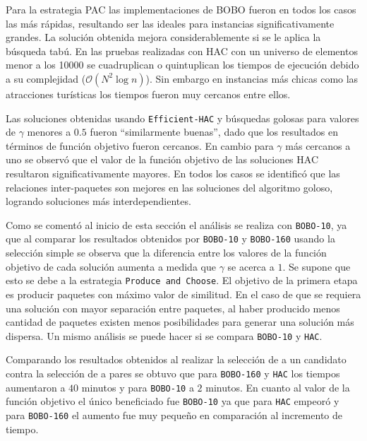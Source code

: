 Para la estrategia PAC las implementaciones de BOBO fueron en todos los casos las más rápidas, resultando ser las ideales para instancias significativamente grandes. La solución obtenida mejora considerablemente si se le aplica la búsqueda tabú. En las pruebas realizadas con HAC con un universo de elementos menor a los 10000 se cuadruplican o quintuplican los tiempos de ejecución debido a su complejidad ($\mathcal{O}(N^{2}\log n)$). Sin embargo en instancias más chicas como las atracciones turísticas los tiempos fueron muy cercanos entre ellos.

Las soluciones obtenidas usando \texttt{Efficient-HAC} y búsquedas golosas para valores de $\gamma$ menores a $0.5$ fueron \textquotedblleft similarmente buenas\textquotedblright , dado que los resultados en términos de función objetivo fueron cercanos. En cambio para $\gamma$ más cercanos a uno se observó que el valor de la función objetivo de las soluciones HAC resultaron significativamente mayores. En todos los casos se identificó que las relaciones inter-paquetes son mejores en las soluciones del algoritmo goloso, logrando soluciones más interdependientes.

Como se comentó al inicio de esta sección el análisis se realiza con \texttt{BOBO-10}, ya que al comparar los resultados obtenidos por \texttt{BOBO-10} y \texttt{BOBO-160} usando la selección simple se observa que la diferencia entre los valores de la función objetivo de cada solución aumenta a medida que $\gamma$ se acerca a $1$. Se supone que esto se debe a la estrategia \texttt{Produce and Choose}. El objetivo de la primera etapa es producir paquetes con máximo valor de similitud. En el caso de que se requiera una solución con mayor separación entre paquetes, al haber producido menos cantidad de paquetes existen menos posibilidades para generar una solución más dispersa. Un mismo análisis se puede hacer si se compara \texttt{BOBO-10} y \texttt{HAC}.

Comparando los resultados obtenidos al realizar la selección de a un candidato contra la selección de a pares se obtuvo que para \texttt{BOBO-160} y \texttt{HAC} los tiempos aumentaron a $40$ minutos y para \texttt{BOBO-10} a $2$ minutos. En cuanto al valor de la función objetivo el único beneficiado fue \texttt{BOBO-10} ya que para \texttt{HAC} empeoró y para \texttt{BOBO-160} el aumento fue muy pequeño en comparación al incremento de tiempo.